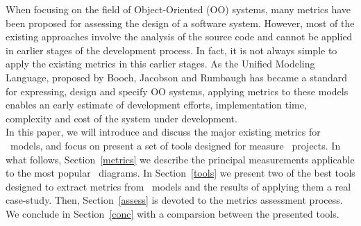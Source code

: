 When focusing on the field of Object-Oriented (OO) systems, many metrics have been proposed for assessing the design of a software system.
However, most of the existing approaches involve the analysis of the source code and cannot be applied in earlier stages of the development process.
In fact, it is not always simple to apply the existing metrics in this earlier stages. 
As the \textsf{Unified Modeling Language}, proposed by Booch, Jacobson and Rumbaugh\cite{USDPuml} has became a standard for expressing, design and specify OO systems, applying metrics to these models enables an early estimate of development efforts, implementation time, complexity and cost of the system under development. \\

In this paper, we will introduce and discuss the major existing metrics for \umlS~models, and focus on present a set of tools designed for measure \umlS~projects.
In what follows, Section~\ref{metrics} we describe the principal measurements applicable to the most popular \umlS~diagrams.
In Section~\ref{tools} we present two of the best tools designed to extract metrics from \umlS~models and the results of applying them a real case-study.
Then, Section~\ref{assess} is devoted to the metrics assessment process.
We conclude in Section~\ref{conc} with a comparsion between the presented tools.


